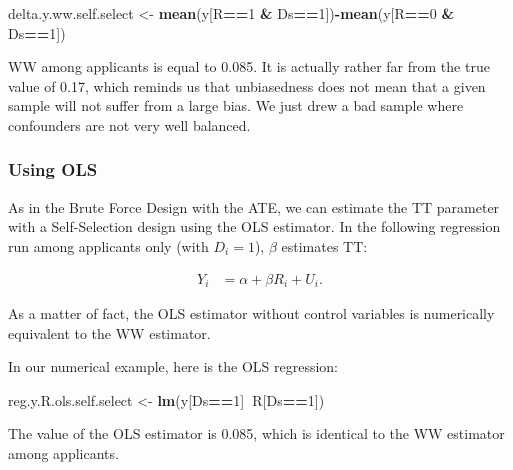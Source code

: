 \documentclass[]{book}
\newenvironment{Shaded}{\begin{snugshade}}{\end{snugshade}}
\newcommand{\DecValTok}[1]{\textcolor[rgb]{0.00,0.00,0.81}{#1}}
\newcommand{\KeywordTok}[1]{\textcolor[rgb]{0.13,0.29,0.53}{\textbf{#1}}}
\newcommand{\NormalTok}[1]{#1}
\newcommand{\OperatorTok}[1]{\textcolor[rgb]{0.81,0.36,0.00}{\textbf{#1}}}
\newcommand{\StringTok}[1]{\textcolor[rgb]{0.31,0.60,0.02}{#1}}
\theoremstyle{definition}
\theoremstyle{definition}
\theoremstyle{definition}
\theoremstyle{remark}
\let\BeginKnitrBlock\begin \let\EndKnitrBlock\end
\begin{document}
\begin{Shaded}
\begin{Highlighting}[]
\NormalTok{delta.y.ww.self.select <-}\StringTok{ }\KeywordTok{mean}\NormalTok{(y[R}\OperatorTok{==}\DecValTok{1} \OperatorTok{&}\StringTok{ }\NormalTok{Ds}\OperatorTok{==}\DecValTok{1}\NormalTok{])}\OperatorTok{-}\KeywordTok{mean}\NormalTok{(y[R}\OperatorTok{==}\DecValTok{0} \OperatorTok{&}\StringTok{ }\NormalTok{Ds}\OperatorTok{==}\DecValTok{1}\NormalTok{])}
\end{Highlighting}
\end{Shaded}

WW among applicants is equal to 0.085.
It is actually rather far from the true value of 0.17, which reminds us that unbiasedness does not mean that a given sample will not suffer from a large bias.
We just drew a bad sample where confounders are not very well balanced.

\hypertarget{using-ols-1}{%
\subsubsection{Using OLS}\label{using-ols-1}}

As in the Brute Force Design with the ATE, we can estimate the TT parameter with a Self-Selection design using the OLS estimator.
In the following regression run among applicants only (with \(D_i=1\)), \(\beta\) estimates TT:

\begin{align*}
    Y_i &  = \alpha +  \beta R_i + U_i.
    \end{align*}

As a matter of fact, the OLS estimator without control variables is numerically equivalent to the WW estimator.

\BeginKnitrBlock{example}
\protect\hypertarget{exm:unnamed-chunk-84}{}{\label{exm:unnamed-chunk-84} }In our numerical example, here is the OLS regression:
\EndKnitrBlock{example}

\begin{Shaded}
\begin{Highlighting}[]
\NormalTok{reg.y.R.ols.self.select <-}\StringTok{ }\KeywordTok{lm}\NormalTok{(y[Ds}\OperatorTok{==}\DecValTok{1}\NormalTok{]}\OperatorTok{~}\NormalTok{R[Ds}\OperatorTok{==}\DecValTok{1}\NormalTok{])}
\end{Highlighting}
\end{Shaded}

The value of the OLS estimator is 0.085, which is identical to the WW estimator among applicants.
\end{document}
